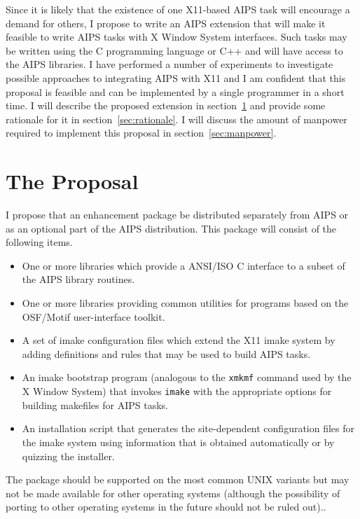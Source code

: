 Since it is likely that the existence of one X11-based AIPS task will
encourage a demand for others, I propose to write an AIPS extension
that will make it feasible to write AIPS tasks with X Window System
interfaces.  Such tasks may be written using the C programming
language or C++ and will have access to the AIPS libraries.  I have
performed a number of experiments to investigate possible approaches
to integrating AIPS with X11 and I am confident that this proposal is
feasible and can be implemented by a single programmer in a short
time.  I will describe the proposed extension in
section~\ref{sec:proposal} and provide some rationale for it in
section~\ref{sec:rationale}.  I will discuss the amount of manpower
required to implement this proposal in section~\ref{sec:manpower}.

\section{The Proposal}
\label{sec:proposal}

I propose that an enhancement package be distributed separately from
AIPS or as an optional part of the AIPS distribution.  This package
will consist of the following items.
\begin{itemize}
\item
One or more libraries which provide a ANSI/ISO C interface to a subset
of the AIPS library routines.

\item
One or more libraries providing common utilities for programs based on
the OSF/Motif user-interface toolkit.

\item
A set of imake configuration files which extend the X11 imake system
by adding definitions and rules that may be used to build AIPS tasks.

\item
An imake bootstrap program (analogous to the {\tt xmkmf} command used
by the X Window System) that invokes {\tt imake} with the appropriate
options for building makefiles for AIPS tasks.

\item
An installation script that generates the site-dependent configuration
files for the imake system using information that is obtained
automatically or by quizzing the installer.
\end{itemize}
The package should be supported on the most common UNIX variants but
may not be made available for other operating systems (although
the possibility of porting to other operating systems in the future
should not be ruled out)..

